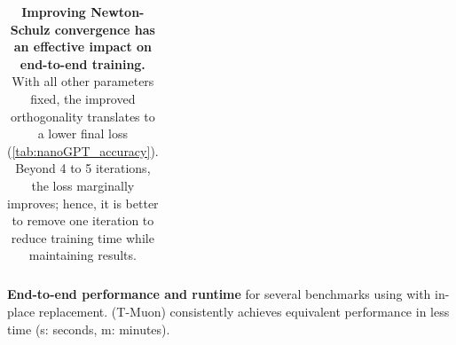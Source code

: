\begin{table}[t]
\begin{subtable}{0.51\linewidth}
\begin{tabular}{lccc}
        \bottomrule
        \end{tabular}
        \vspace{5mm}
    \caption{\textbf{End-to-end performance and runtime} for several benchmarks using \turbomuon with in-place replacement. \turbomuon (T-Muon) consistently achieves equivalent performance in less time (s: seconds, m: minutes).}
    \label{tab:end2endperf}
    \end{subtable}
\caption{\textbf{Improving Newton-Schulz convergence has an effective impact on end-to-end training.} With all other parameters fixed, the improved orthogonality translates to a lower final loss (\cref{tab:nanoGPT_accuracy}). Beyond 4 to 5 iterations, the loss marginally improves; hence, it is better to remove one iteration to reduce training time while maintaining results.}
\end{table}

